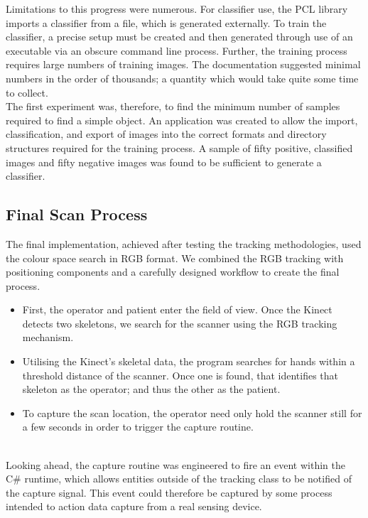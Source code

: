 Limitations to this progress were numerous. For classifier use, the PCL library imports a classifier from a file, which is generated externally. To train the classifier, a precise setup must be created and then generated through use of an executable via an obscure command line process. Further, the training process requires large numbers of training images. The documentation suggested minimal numbers in the order of thousands; a quantity which would take quite some time to collect.\\

The first experiment was, therefore, to find the minimum number of samples required to find a simple object. An application was created to allow the import, classification, and export of images into the correct formats and directory structures required for the training process. A sample of fifty positive, classified images and fifty negative images was found to be sufficient to generate a classifier.\\

\subsection{Final Scan Process}
The final implementation, achieved after testing the tracking methodologies, used the colour space search in RGB format. We combined the RGB tracking with positioning components and a carefully designed workflow to create the final process. \\

\begin{itemize}
\item First, the operator and patient enter the field of view. Once the Kinect detects two skeletons, we search for the scanner using the RGB tracking mechanism.
\item Utilising the Kinect's skeletal data, the program searches for hands within a threshold distance of the scanner. Once one is found, that identifies that skeleton as the operator; and thus the other as the patient.
\item To capture the scan location, the operator need only hold the scanner still for a few seconds in order to trigger the capture routine. 
\end{itemize} \\

Looking ahead, the capture routine was engineered to fire an event within the C# runtime, which allows entities outside of the tracking class to be notified of the capture signal. This event could therefore be captured by some process intended to action data capture from a real sensing device. \\

